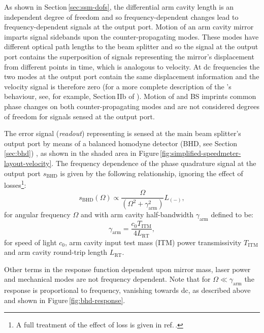 As shown in Section\,\ref{sec:ssm-dofs}, the differential arm cavity length \LMINUS{} is an independent degree of freedom and so frequency-dependent changes lead to frequency-dependent signals at the output port. Motion of an arm cavity mirror imparts signal sidebands upon the counter-propagating modes. These modes have different optical path lengths to the beam splitter and so the signal at the output port contains the superposition of signals representing the mirror's displacement from different points in time, which is analogous to velocity. At dc frequencies the two modes at the output port contain the same displacement information and the velocity signal is therefore zero (for a more complete description of the \SSM{}'s behaviour, see, for example, Section\,IIb of \cite{Chen2003}). Motion of \MINT{} and BS imprints common phase changes on both counter-propagating modes and are not considered degrees of freedom for signals sensed at the output port.

The error signal (\emph{readout}) representing \LMINUS{} is sensed at the main beam splitter's output port by means of a balanced homodyne detector (\gls{BHD}, see Section\,\ref{sec:bhd}) \cite{Steinlechner2015}, as shown in the shaded  area in Figure\,\ref{fig:simplified-speedmeter-layout-velocity}. The frequency dependence of the phase quadrature signal at the output port $s_{\textrm{BHD}}$ is given by the following relationship, ignoring the effect of losses\footnote{A full treatment of the effect of loss is given in ref.\,\cite{Danilishin2015}.}:
\begin{equation}
  \label{eq:asymdarmbhdresponse}
  s_{\textrm{BHD}} \left( \Omega \right) \propto \frac{\Omega}{ \left(\Omega^2 + \gamma_{\textrm{arm}}^2 \right)} L_{\left(-\right)},
\end{equation}
for angular frequency $\Omega$ and with arm cavity half-bandwidth $\gamma_{\textrm{arm}}$ defined to be:
\begin{equation}
  \gamma_{\textrm{arm}} = \frac{c_{0} T_{\textrm{ITM}}}{4 L_{\textrm{RT}}},
\end{equation}
for speed of light $c_{0}$, arm cavity input test mass (\gls{ITM}) power transmissivity $T_{\textrm{ITM}}$ and arm cavity round-trip length $L_{\textrm{RT}}$.
   
Other terms in the response function dependent upon mirror mass, laser power and mechanical modes are not frequency dependent. Note that for $\Omega \ll \gamma_{\textrm{arm}}$ the response is proportional to frequency, vanishing towards dc, as described above and shown in Figure\,\ref{fig:bhd-response}.


